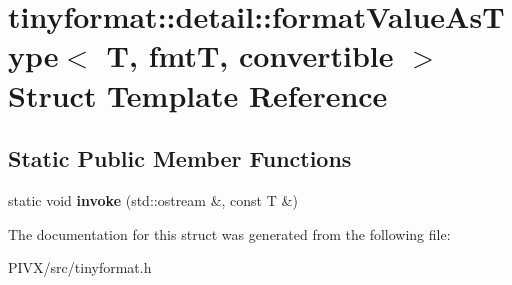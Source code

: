 \hypertarget{structtinyformat_1_1detail_1_1format_value_as_type}{}\section{tinyformat\+:\+:detail\+:\+:format\+Value\+As\+Type$<$ T, fmtT, convertible $>$ Struct Template Reference}
\label{structtinyformat_1_1detail_1_1format_value_as_type}
\subsection*{Static Public Member Functions}
\begin{DoxyCompactItemize}
\item 
\mbox{\label{structtinyformat_1_1detail_1_1format_value_as_type_a126bc5958024c456851f08fa380d1cac}} 
static void {\bfseries invoke} (std\+::ostream \&, const T \&)
\end{DoxyCompactItemize}


The documentation for this struct was generated from the following file\+:\begin{DoxyCompactItemize}
\item 
P\+I\+V\+X/src/tinyformat.\+h\end{DoxyCompactItemize}
